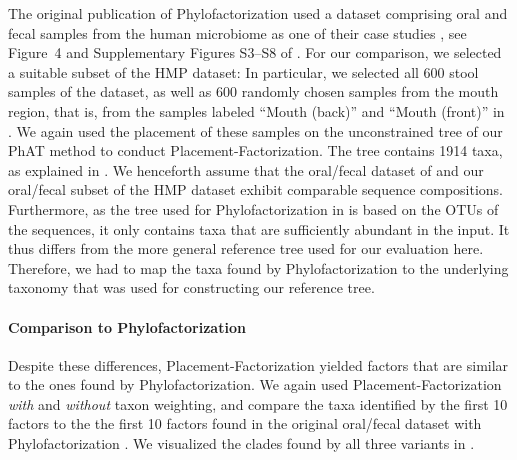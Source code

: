 The original publication of Phylofactorization used a dataset comprising oral and fecal samples from the human microbiome
as one of their case studies \cite{Caporaso2011}, see Figure~4 and Supplementary Figures S3--S8 of .
For our comparison, we selected a suitable subset of the \ac{HMP} dataset: %
In particular, we selected all \num{600} stool samples of the dataset,
as well as \num{600} randomly chosen samples from the mouth region,
that is, from the samples labeled ``Mouth (back)'' and ``Mouth (front)'' in .
We again used the placement of these samples on the unconstrained  tree
of our \acf{PhAT} method to conduct Placement-Factorization.
The tree contains \num{1 914} taxa, as explained in .
We henceforth assume that the oral/fecal dataset of 
and our oral/fecal subset of the \ac{HMP} dataset exhibit comparable sequence compositions.
Furthermore, as the tree used for Phylofactorization in  is based on the OTUs of the sequences,
it only contains taxa that are sufficiently abundant in the input.
It thus differs from the more general  reference tree used for our evaluation here.
Therefore, we had to map the taxa found by Phylofactorization
to the underlying  taxonomy \cite{Quast2013,Yilmaz2014} that was used for constructing our reference tree.


\paragraph{Comparison to Phylofactorization}
\label{sec:Factorization:sub:Evaluation:sub:OralFecalHMPDataset:par:Comparison}

Despite these differences, Placement-Factorization yielded factors that are similar to the ones found by Phylofactorization.
We again used Placement-Factorization \emph{with} and \emph{without} taxon weighting,
and compare the taxa identified by the first \num{10} factors
to the the first \num{10} factors found in the original oral/fecal dataset with Phylofactorization \cite{Washburne2017a}.
We visualized the clades found by all three variants in .

